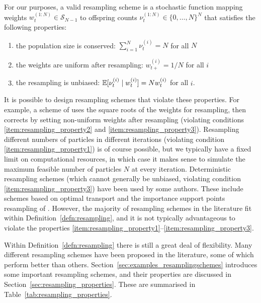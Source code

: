 \begin{defn}\label{defn:resampling}
For our purposes, a valid resampling scheme is a stochastic function mapping weights 
$w_t^{(1:N)} \in \mathcal{S}_{N-1}$ 
to offspring counts 
$\nu_t^{(1:N)} \in \{0,\dots,N\}^N $
that satisfies the following properties:
\begin{enumerate}
\item\label{item:resampling_property1} the population size is conserved:
$ \sum_{i=1}^N \nu_t^{(i)} =N $ for all $N$
\item\label{item:resampling_property2} the weights are uniform after resampling:
$w_{t+}^{(i)} = 1/N$ for all $i$
\item\label{item:resampling_property3} the resampling is unbiased:
$ \mathbb{E}[ \nu_t^{(i)} \mid w_t^{(i)} ] = N w_t^{(i)} $ for all $i$.
\end{enumerate}
\end{defn}
It is possible to design resampling schemes that violate these properties.
For example, a scheme of \textcite{liu1998} uses the square roots of the weights for resampling, then corrects by setting non-uniform weights after resampling (violating conditions \ref{item:resampling_property2} and \ref{item:resampling_property3}).
%
Resampling different numbers of particles in different iterations (violating condition \ref{item:resampling_property1}) is of course possible, but we typically have a fixed limit on computational resources, in which case it makes sense to simulate the maximum feasible number of particles $N$ at every iteration.
%
Deterministic resampling schemes (which cannot generally be unbiased, violating condition \ref{item:resampling_property3}) have been used by some authors. These include schemes based on optimal transport \parencite{reich2013, myers2021, corenflos2021} and the importance support points resampling of \textcite{huang2020}.
However, the majority of resampling schemes in the literature fit within Definition~\ref{defn:resampling}, and it is not typically advantageous to violate the properties \ref{item:resampling_property1}--\ref{item:resampling_property3}.

Within Definition~\ref{defn:resampling} there is still a great deal of flexibility. Many different resampling schemes have been proposed in the literature, some of which perform better than others.
 Section~\ref{sec:examples_resamplingschemes} introduces some important resampling schemes, and their properties are discussed in Section~\ref{sec:resampling_properties}. 
These are summarised in Table~\ref{tab:resampling_properties}.



